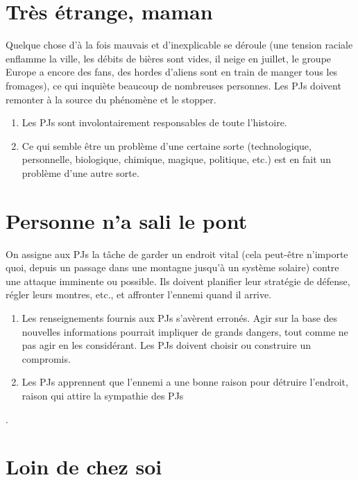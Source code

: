 \begin{multicols}{2}
\section{Très étrange, maman}
\hypertarget{etrange}{}


Quelque chose d'à la fois mauvais et d'inexplicable se déroule (une tension raciale enflamme la ville, les débits de bières sont vides, il neige en juillet, le groupe Europe a encore des fans, des hordes d'aliens sont en train de manger tous les fromages), ce qui inquiète beaucoup de nombreuses personnes. Les PJs doivent remonter à la source du phénomène et le stopper.

\themes
\begin{enumerate}
\item Les PJs sont involontairement responsables de toute l'histoire.
\item Ce qui semble être un problème d'une certaine sorte (technologique, personnelle, biologique, chimique, magique, politique, etc.) est en fait un problème d'une autre sorte.
\end{enumerate}

\section{Personne n'a sali le pont}
\hypertarget{pont}{}


On assigne aux PJs la tâche de garder un endroit vital (cela peut-être n'importe quoi, depuis un passage dans une montagne jusqu'à un système solaire) contre une attaque imminente ou possible. Ils doivent planifier leur stratégie de défense, régler leurs montres, etc., et affronter l'ennemi quand il arrive.

\themes
\begin{enumerate}
\item Les renseignements fournis aux PJs s'avèrent erronés. Agir sur la base des nouvelles informations pourrait impliquer de grands dangers, tout comme ne pas agir en les considérant. Les PJs doivent choisir ou construire un compromis.
\item Les PJs apprennent que l'ennemi a une bonne raison pour détruire l'endroit, raison qui attire la sympathie des PJs
\end{enumerate}.

\section{Loin de chez soi}
\hypertarget{loin}{}


\end{multicols}
